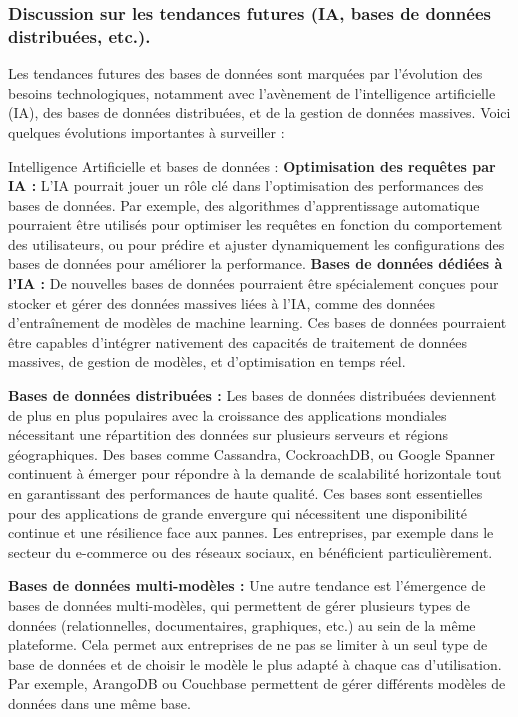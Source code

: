 \documentclass{article}
\begin{document}
\subsubsection{Discussion sur les tendances futures (IA, bases de données distribuées, etc.).}
Les tendances futures des bases de données sont marquées par l’évolution des besoins technologiques, notamment avec l’avènement de l’intelligence artificielle (IA), des bases de données distribuées, et de la gestion de données massives. Voici quelques évolutions importantes à surveiller :

    Intelligence Artificielle et bases de données :
        \textbf{Optimisation des requêtes par IA :}
        L'IA pourrait jouer un rôle clé dans l’optimisation des performances des bases de données. Par exemple, des algorithmes d’apprentissage automatique pourraient être utilisés pour optimiser les requêtes en fonction du comportement des utilisateurs, ou pour prédire et ajuster dynamiquement les configurations des bases de données pour améliorer la performance.
        \textbf{Bases de données dédiées à l'IA :} 
        De nouvelles bases de données pourraient être spécialement conçues pour stocker et gérer des données massives liées à l’IA, comme des données d’entraînement de modèles de machine learning. Ces bases de données pourraient être capables d’intégrer nativement des capacités de traitement de données massives, de gestion de modèles, et d’optimisation en temps réel.

    \textbf{Bases de données distribuées :}
        Les bases de données distribuées deviennent de plus en plus populaires avec la croissance des applications mondiales nécessitant une répartition des données sur plusieurs serveurs et régions géographiques. Des bases comme Cassandra, CockroachDB, ou Google Spanner continuent à émerger pour répondre à la demande de scalabilité horizontale tout en garantissant des performances de haute qualité.
        Ces bases sont essentielles pour des applications de grande envergure qui nécessitent une disponibilité continue et une résilience face aux pannes. Les entreprises, par exemple dans le secteur du e-commerce ou des réseaux sociaux, en bénéficient particulièrement.

    \textbf{Bases de données multi-modèles :}
        Une autre tendance est l'émergence de bases de données multi-modèles, qui permettent de gérer plusieurs types de données (relationnelles, documentaires, graphiques, etc.) au sein de la même plateforme. Cela permet aux entreprises de ne pas se limiter à un seul type de base de données et de choisir le modèle le plus adapté à chaque cas d’utilisation. Par exemple, ArangoDB ou Couchbase permettent de gérer différents modèles de données dans une même base.
\end{document}
